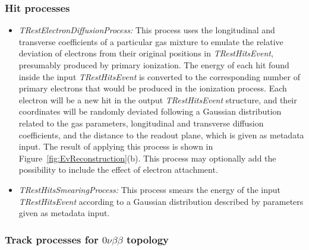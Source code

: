 \subsubsection{ Hit processes } 
\begin{itemize}

	\item \emph{TRestElectronDiffusionProcess:} This process uses the longitudinal and transverse coefficients of a particular gas mixture to emulate the relative deviation of electrons from their original positions in \emph{TRestHitsEvent}, presumably produced by primary ionization. The energy of each hit found inside the input \emph{TRestHitsEvent} is converted to the corresponding number of primary electrons that would be produced in the ionization process. Each electron will be a new hit in the output \emph{TRestHitsEvent} structure, and their coordinates will be randomly deviated following a Gaussian distribution related to the gas parameters, longitudinal and transverse diffusion coefficients, and the distance to the readout plane, which is given as metadata input. The result of applying this process is shown in Figure~\ref{fig:EvReconstruction}(b). This process may optionally add the possibility to include the effect of electron attachment.

\item \emph{TRestHitsSmearingProcess:} This process smears the energy of the input \emph{TRestHitsEvent} according to a Gaussian distribution described by parameters given as metadata input.%
\end{itemize}

\subsubsection{ Track processes for $0\nu\beta\beta$ topology }\label{sc:trackProcesses}

